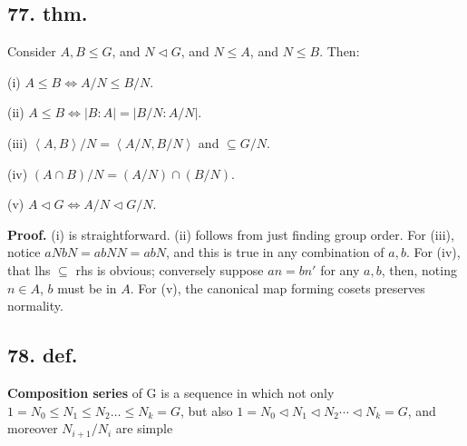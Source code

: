 \documentclass[12pt]{article}
\newcommand{\Eq}{\Leftrightarrow}%
\newcommand{\Ab}[1]{ \left\langle #1 \right\rangle } %
\newcommand{\Ss}[1]{\textsf{\textbf{#1}}}%
\begin{document}
\subsection*{77. thm.} Consider \(A, B \leq G\), and \(N \lhd G\), and \(N \leq A\), and \(N \leq B\). Then: \par
(i) \(A \leq B \Eq A/N \leq B/N\). \par
(ii) \(A \leq B \Eq |B:A| = |B/N : A/N|\). \par
(iii) \(\Ab{A,B}/N = \Ab{A/N, B/N}\) and \(\subseteq G/N\). \par
(iv) \((A \cap B)/N = (A/N) \cap (B/N)\). \par
(v) \(A \lhd G \Eq A/N \lhd G/N\). \par
\Ss{Proof.} (i) is straightforward. 
(ii) follows from just finding group order. 
For (iii), notice \(aNbN = abNN = abN\), and this is true in any combination of \(a,b\). 
For (iv), that lhs \(\subseteq\) rhs is obvious; conversely suppose \(an = bn'\) for any \(a,b\), then, noting \(n \in A\), \(b\) must be in \(A\). 
For (v), the canonical map forming cosets preserves normality.

\subsection*{78. def.} \Ss{Composition series} of G is a sequence in which not only \(1 = N_0 \leq N_1 \leq N_2 \dotsc\leq N_k = G\), 
but also \(1 = N_0 \lhd N_1 \lhd N_2 \dotsb\lhd N_k = G\), 
and moreover \(N_{i+1} / N_i\) are simple
\end{document}
